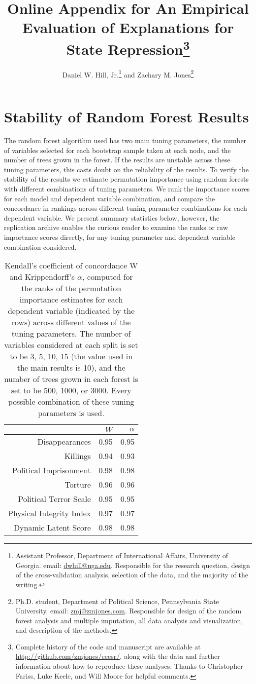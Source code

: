 \documentclass[11pt]{article}
\title{Online Appendix for An Empirical Evaluation of Explanations for State Repression\thanks{Complete history of the code and manuscript are available at \url{http://github.com/zmjones/eeesr/}, along with the data and further information about how to reproduce these analyses. Thanks to Christopher Fariss, Luke Keele, and Will Moore for helpful comments.}}
\author{Daniel W. Hill, Jr.\thanks{Assistant Professor, Department of International Affairs,
University of Georgia. email: \href{mailto:dwhill@uga.edu}{dwhill@uga.edu}. Responsible for the research question, design of the cross-validation analysis, selection of the data, and the majority of the writing.} and Zachary M. Jones\thanks{Ph.D. student, Department of Political Science, Pennsylvania State University. email: \href{mailto:zmj@zmjones.com}{zmj@zmjones.com}. Responsible for design of the random forest analysis and multiple imputation, all data analysis and visualization, and description of the methods.}}
\date{}
\begin{document}
\maketitle

\section*{Stability of Random Forest Results}

The random forest algorithm used has two main tuning parameters, the number of variables selected for each bootstrap sample taken at each node, and the number of trees grown in the forest. If the results are unstable across these tuning parameters, this casts doubt on the reliability of the results. To verify the stability of the results we estimate permutation importance using random forests with different combinations of tuning parameters. We rank the importance scores for each model and dependent variable combination, and compare the concordance in rankings across different tuning parameter combinations for each dependent variable. We present summary statistics below, however, the replication archive enables the curious reader to examine the ranks or raw importance scores directly, for any tuning parameter and dependent variable combination considered.

\begin{table}[ht]
\centering
\begin{tabular}{rrr}
  \hline
 & $W$ & $\alpha$ \\ 
  \hline
Disappearances & 0.95 & 0.95 \\ 
  Killings & 0.94 & 0.93 \\ 
  Political Imprisonment & 0.98 & 0.98 \\ 
  Torture & 0.96 & 0.96 \\ 
  Political Terror Scale & 0.95 & 0.95 \\ 
  Physical Integrity Index & 0.97 & 0.97 \\ 
  Dynamic Latent Score & 0.98 & 0.98 \\ 
   \hline
\end{tabular}
\caption{Kendall's coefficient of concordance W and Krippendorff's $\alpha$, computed for the ranks of the permutation importance estimates for each dependent variable (indicated by the rows) across different values of the tuning parameters. The number of variables considered at each split is set to be 3, 5, 10, 15 (the value used in the main results is 10), and the number of trees grown in each forest is set to be 500, 1000, or 3000. Every possible combination of these tuning parameters is used.}
\end{table}
\end{document}
